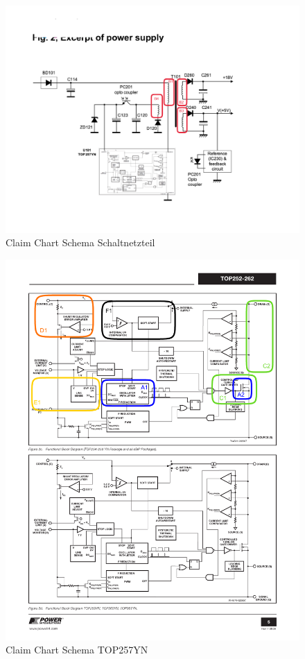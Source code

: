 \begin{figure}[h!]
	\centering
	\includegraphics[trim = 20mm 20mm 50mm 50mm, clip, width=1\textwidth]{graphics/SchemaClaim}
	\caption{Claim Chart Schema Schaltnetzteil}
	\label{fig:CCHSchema}
\end{figure} 
\newpage

\begin{figure}[h!]
	\centering
	\includegraphics[trim = 1mm 142mm 1mm 20mm, clip, width=1\textwidth]{graphics/SchemaClaim2}
	\caption{Claim Chart Schema TOP257YN}
	\label{fig:CCHSchema2}
\end{figure} 